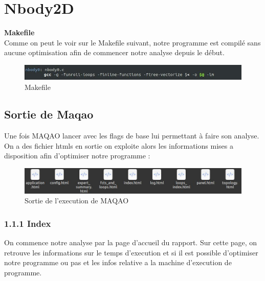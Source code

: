\documentclass[11pt,a4paper,onecolumn,openright,oneside]{report}
\begin{document}
\section{Nbody2D}
\textbf{Makefile}\\

Comme on peut le voir sur le Makefile suivant, notre programme est compilé sans aucune optimisation afin de commencer notre analyse depuis le début.
\begin{figure}[H]
    \centering
    \includegraphics[scale=0.55]{Images/1/makefile.jpg}
    \caption{Makefile}
    \label{fig:my_label}
\end{figure}

\subsection{Sortie de Maqao}

Une fois MAQAO lancer avec les flags de base lui permettant à faire son analyse. On a des fichier htmls en sortie on exploite alors les informations mises a disposition afin d'optimiser notre programme : 
\begin{figure}[H]
    \centering
    \includegraphics[scale=0.5]{Images/1/maqao.jpg}
    \caption{Sortie de l'execution de MAQAO}
    \label{fig:my_label}
\end{figure}

\subsubsection{1.1.1 Index}
On commence notre analyse par la page d'accueil du rapport. Sur cette page, on retrouve les informations sur le temps d'execution et si il est possible d'optimiser notre programme ou pas et les infos relative a la machine d'execution de programme.
\end{document}
